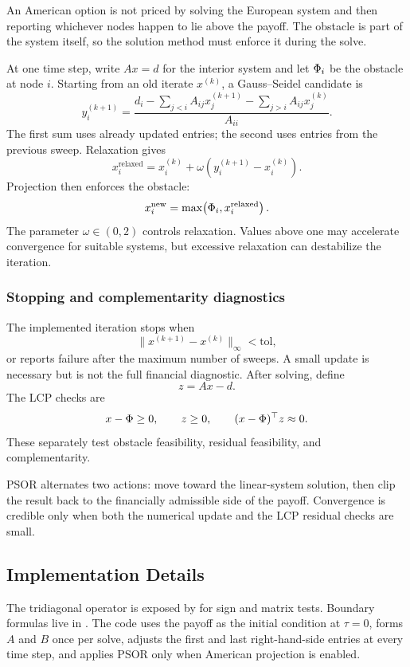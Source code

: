 \begin{commonconfusion}
An American option is not priced by solving the European system and then
reporting whichever nodes happen to lie above the payoff. The obstacle is part
of the system itself, so the solution method must enforce it during the solve.
\end{commonconfusion}

At one time step, write \(Ax=d\) for the interior system and let
\(\Phi_i\) be the obstacle at node \(i\). Starting from an old iterate
\(x^{(k)}\), a Gauss--Seidel candidate is
\[
  y_i^{(k+1)}
  =
  \frac{
    d_i
    -\sum_{j<i}A_{ij}x_j^{(k+1)}
    -\sum_{j>i}A_{ij}x_j^{(k)}
  }{A_{ii}}.
\]
The first sum uses already updated entries; the second uses entries from the
previous sweep. Relaxation gives
\[
  x_i^{\mathrm{relaxed}}
  =
  x_i^{(k)}
  +\omega\left(y_i^{(k+1)}-x_i^{(k)}\right).
\]
Projection then enforces the obstacle:
\[
  x_i^{\mathrm{new}}=\max\!\left(\Phi_i,
  x_i^{\mathrm{relaxed}}\right).
\]
The parameter \(\omega\in(0,2)\) controls relaxation. Values above one may
accelerate convergence for suitable systems, but excessive relaxation can
destabilize the iteration.

\subsubsection{Stopping and complementarity diagnostics}
The implemented iteration stops when
\[
  \lVert x^{(k+1)}-x^{(k)}\rVert_\infty<\text{tol},
\]
or reports failure after the maximum number of sweeps. A small update is
necessary but is not the full financial diagnostic. After solving, define
\[
  z=Ax-d.
\]
The LCP checks are
\[
  x-\Phi\geq0,
  \qquad
  z\geq0,
  \qquad
  (x-\Phi)^\top z\approx0.
\]
These separately test obstacle feasibility, residual feasibility, and
complementarity.

\begin{readerintuition}
PSOR alternates two actions: move toward the linear-system solution, then clip
the result back to the financially admissible side of the payoff. Convergence
is credible only when both the numerical update and the LCP residual checks are
small.
\end{readerintuition}

\subsection{Implementation Details}
The tridiagonal operator is exposed by
 for sign and matrix tests. Boundary formulas live
in . The code uses the payoff as the
initial condition at \(\tau=0\), forms \(A\) and \(B\) once per solve, adjusts
the first and last right-hand-side entries at every time step, and applies PSOR
only when American projection is enabled.


